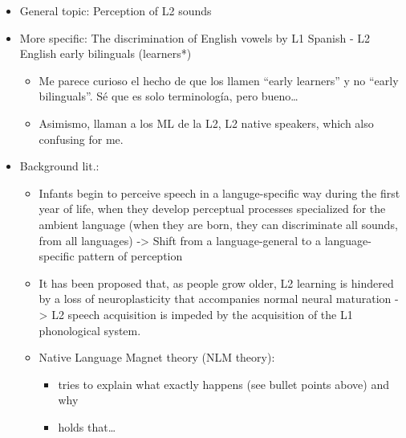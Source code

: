 \documentclass[
]{article}
\providecommand{\tightlist}{%
  \setlength{\itemsep}{0pt}\setlength{\parskip}{0pt}}
\begin{document}
\begin{itemize}
\item
  General topic: Perception of L2 sounds
\item
  More specific: The discrimination of English vowels by L1 Spanish - L2
  English early bilinguals (learners*)

  \begin{itemize}
  \tightlist
  \item
    Me parece curioso el hecho de que los llamen ``early learners'' y no
    ``early bilinguals''. Sé que es solo terminología, pero
    bueno\ldots{}
  \item
    Asimismo, llaman a los ML de la L2, L2 native speakers, which also
    confusing for me.
  \end{itemize}
\item
  Background lit.:

  \begin{itemize}
  \tightlist
  \item
    Infants begin to perceive speech in a languge-specific way during
    the first year of life, when they develop perceptual processes
    specialized for the ambient language (when they are born, they can
    discriminate all sounds, from all languages) -\textgreater{} Shift
    from a language-general to a language-specific pattern of perception
  \item
    It has been proposed that, as people grow older, L2 learning is
    hindered by a loss of neuroplasticity that accompanies normal neural
    maturation -\textgreater{} L2 speech acquisition is impeded by the
    acquisition of the L1 phonological system.
  \item
    Native Language Magnet theory (NLM theory):

    \begin{itemize}
    \tightlist
    \item
      tries to explain what exactly happens (see bullet points above)
      and why
    \item
      holds that\ldots{}


\end{itemize}
\end{itemize}
\end{itemize}
\end{document}
